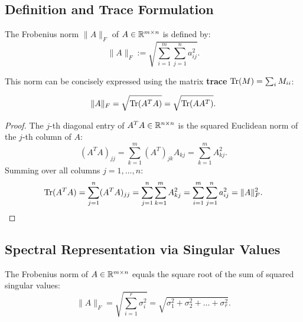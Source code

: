 \subsection{Definition and Trace Formulation}

\begin{definition}
The Frobenius norm $\|A\|_F$ of $A \in \mathbb{R}^{m \times n}$ is defined by:
\begin{equation}
    \|A\|_F := \sqrt{\sum_{i=1}^m \sum_{j=1}^n a_{ij}^2}.
\end{equation}
\end{definition}

This norm can be concisely expressed using the matrix \textbf{trace} $\operatorname{Tr}(M) = \sum_i M_{ii}$:

\begin{proposition}
\begin{equation}
    \|A\|_F = \sqrt{\operatorname{Tr}(A^T A)} = \sqrt{\operatorname{Tr}(A A^T)}.
\end{equation}
\end{proposition}

\begin{proof}
The $j$-th diagonal entry of $A^T A \in \mathbb{R}^{n \times n}$ is the squared Euclidean norm of the $j$-th column of $A$:
\begin{equation}
    (A^T A)_{jj} = \sum_{k=1}^m (A^T)_{jk} A_{kj} = \sum_{k=1}^m A_{kj}^2.
\end{equation}
Summing over all columns $j = 1, \dots, n$:
\begin{equation}
    \operatorname{Tr}(A^T A) = \sum_{j=1}^n (A^T A)_{jj} = \sum_{j=1}^n \sum_{k=1}^m A_{kj}^2 = \sum_{i=1}^m \sum_{j=1}^n a_{ij}^2 = \|A\|_F^2.
\end{equation}
\end{proof}

\subsection{Spectral Representation via Singular Values}

\begin{theorem}
\label{thm:frobenius-singular-values-en}
The Frobenius norm of $A \in \mathbb{R}^{m \times n}$ equals the square root of the sum of squared singular values:
\begin{equation}
    \|A\|_F = \sqrt{\sum_{i=1}^r \sigma_i^2} = \sqrt{\sigma_1^2 + \sigma_2^2 + \dots + \sigma_r^2}.
\end{equation}
\end{theorem}

